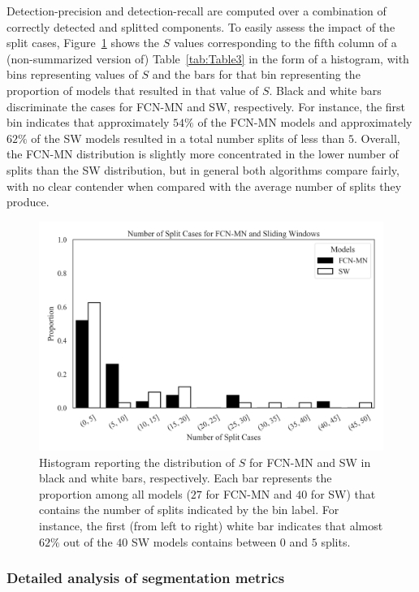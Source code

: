 \documentclass[a4paper,authoryear,review]{elsarticle}
\begin{document}
	
	Detection-precision and detection-recall are computed over a combination of correctly detected and splitted components. To easily assess the impact of the split cases, Figure~\ref{fig:Figure4} shows the $S$ values corresponding to the fifth column of a   (non-summarized version of) Table~\ref{tab:Table3} in the form of a histogram, with bins representing values of $S$ and the bars for that bin representing the proportion of models that resulted in that value of $S$. Black and white bars discriminate the cases for FCN-MN and SW, respectively. For instance, the first bin indicates that approximately $54\%$ of the FCN-MN models and approximately $62\%$ of the SW models resulted in a total number splits of less than $5$. Overall, the FCN-MN distribution is slightly more concentrated in the lower number of splits than the SW distribution, but in general both algorithms compare fairly, with no clear contender when compared with the average number of splits they produce. 
	
	
	\begin{figure}
		\centering
		\includegraphics[width=\textwidth]{figures/Figure4.png}
		\caption{
			Histogram reporting the distribution of $S$ for FCN-MN and SW in black and white bars, respectively. Each bar represents the proportion among all models ($27$ for FCN-MN  and $40$ for SW) that contains the number of splits indicated by the bin label. For instance, the first (from left to right) white bar indicates that almost $62\%$ out of the $40$ SW models contains between $0$ and $5$ splits.
		}
		\label{fig:Figure4}
	\end{figure}
	
	
	\subsubsection{Detailed analysis of segmentation metrics}
	
\end{document}

